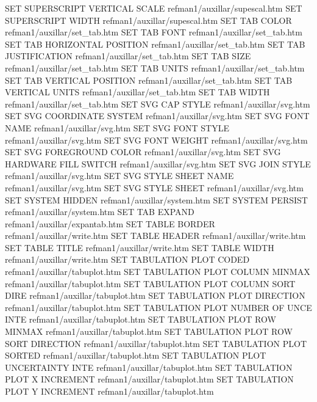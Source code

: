 SET SUPERSCRIPT VERTICAL SCALE          refman1/auxillar/supescal.htm
SET SUPERSCRIPT WIDTH                   refman1/auxillar/supescal.htm
SET TAB COLOR                           refman1/auxillar/set_tab.htm
SET TAB FONT                            refman1/auxillar/set_tab.htm
SET TAB HORIZONTAL POSITION             refman1/auxillar/set_tab.htm
SET TAB JUSTIFICATION                   refman1/auxillar/set_tab.htm
SET TAB SIZE                            refman1/auxillar/set_tab.htm
SET TAB UNITS                           refman1/auxillar/set_tab.htm
SET TAB VERTICAL POSITION               refman1/auxillar/set_tab.htm
SET TAB VERTICAL UNITS                  refman1/auxillar/set_tab.htm
SET TAB WIDTH                           refman1/auxillar/set_tab.htm
SET SVG CAP STYLE                       refman1/auxillar/svg.htm
SET SVG COORDINATE SYSTEM               refman1/auxillar/svg.htm
SET SVG FONT NAME                       refman1/auxillar/svg.htm
SET SVG FONT STYLE                      refman1/auxillar/svg.htm
SET SVG FONT WEIGHT                     refman1/auxillar/svg.htm
SET SVG FOREGROUND COLOR                refman1/auxillar/svg.htm
SET SVG HARDWARE FILL SWITCH            refman1/auxillar/svg.htm
SET SVG JOIN STYLE                      refman1/auxillar/svg.htm
SET SVG STYLE SHEET NAME                refman1/auxillar/svg.htm
SET SVG STYLE SHEET                     refman1/auxillar/svg.htm
SET SYSTEM HIDDEN                       refman1/auxillar/system.htm
SET SYSTEM PERSIST                      refman1/auxillar/system.htm
SET TAB EXPAND                          refman1/auxillar/expantab.htm
SET TABLE BORDER                        refman1/auxillar/write.htm
SET TABLE HEADER                        refman1/auxillar/write.htm
SET TABLE TITLE                         refman1/auxillar/write.htm
SET TABLE WIDTH                         refman1/auxillar/write.htm
SET TABULATION PLOT CODED               refman1/auxillar/tabuplot.htm
SET TABULATION PLOT COLUMN MINMAX       refman1/auxillar/tabuplot.htm
SET TABULATION PLOT COLUMN SORT DIRE    refman1/auxillar/tabuplot.htm
SET TABULATION PLOT DIRECTION           refman1/auxillar/tabuplot.htm
SET TABULATION PLOT NUMBER OF UNCE INTE refman1/auxillar/tabuplot.htm
SET TABULATION PLOT ROW MINMAX          refman1/auxillar/tabuplot.htm
SET TABULATION PLOT ROW SORT DIRECTION  refman1/auxillar/tabuplot.htm
SET TABULATION PLOT SORTED              refman1/auxillar/tabuplot.htm
SET TABULATION PLOT UNCERTAINTY INTE    refman1/auxillar/tabuplot.htm
SET TABULATION PLOT X INCREMENT         refman1/auxillar/tabuplot.htm
SET TABULATION PLOT Y INCREMENT         refman1/auxillar/tabuplot.htm

